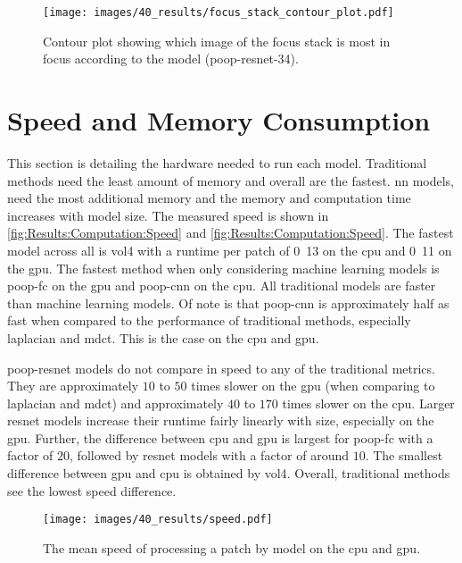 \begin{figure}
    \centering
    \texttt{[image: images/40\_results/focus\_stack\_contour\_plot.pdf]}
    \caption{Contour plot showing which image of the focus stack is most in focus according to the model (\acs{poop}-\acs{resnet}-34).}
    \label{fig:Results:Stack:ContourPlot}
\end{figure}

\FloatBarrier

\section{Speed and Memory Consumption}
\label{sec:Results:Computation}

This section is detailing the hardware needed to run each model. Traditional methods need the least amount of memory and overall are the fastest. \Acl{nn} models, need the most additional memory and the memory and computation time increases with model size. The measured speed is shown in  \autoref{fig:Results:Computation:Speed} and \autoref{fig:Results:Computation:Speed}.
The fastest model across all is \ac{vol4} with a runtime per patch of \unit{0.13}{\milli\second} on the \ac{cpu} and \unit{0.11}{\milli\second} on the \ac{gpu}. The fastest method when only considering machine learning models is \ac{poop}-\ac{fc} on the \ac{gpu} and \ac{poop}-\ac{cnn} on the \ac{cpu}. All traditional models are faster than machine learning models. Of note is that \ac{poop}-\ac{cnn} is approximately half as fast when compared to the performance of traditional methods, especially \ac{laplacian} and \ac{mdct}. This is the case on the \ac{cpu} and \ac{gpu}. 

\ac{poop}-\ac{resnet} models do not compare in speed to any of the traditional metrics. They are approximately $10$ to $50$ times slower on the \ac{gpu} (when comparing to \ac{laplacian} and \ac{mdct}) and approximately $40$ to $170$ times slower on the \ac{cpu}. Larger \ac{resnet} models increase their runtime fairly linearly with size, especially on the \ac{gpu}. Further, the difference between \ac{cpu} and \ac{gpu} is largest for \ac{poop}-\ac{fc} with a factor of $20$, followed by \ac{resnet} models with a factor of around $10$. The smallest difference between \ac{gpu} and \ac{cpu} is obtained by \ac{vol4}. Overall, traditional methods see the lowest speed difference.

\begin{figure}
    \centering
    \texttt{[image: images/40\_results/speed.pdf]}
    \caption{The mean speed of processing a patch by model on the \ac{cpu} and \ac{gpu}.}
    \label{fig:Results:Computation:Speed}
\end{figure}

